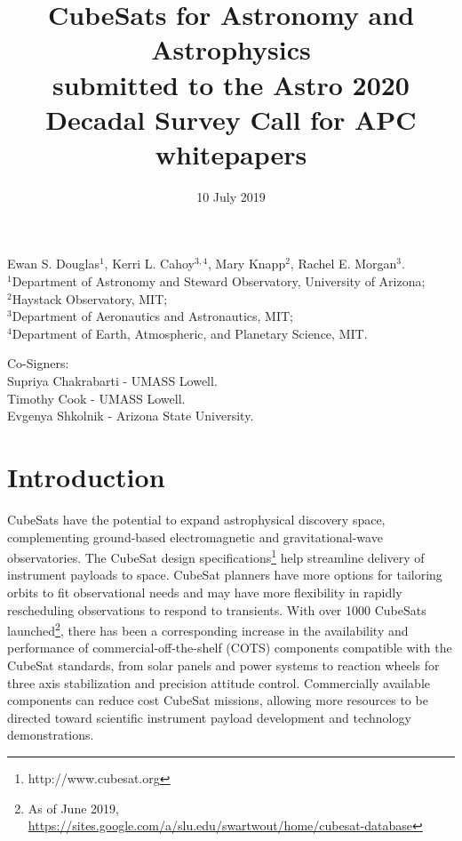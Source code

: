 \documentclass[12pt]{article}
\title{CubeSats for Astronomy and Astrophysics\\
\small{submitted to the Astro 2020 Decadal Survey Call for APC whitepapers}}
\date{10 July 2019}
\begin{document}
\maketitle
\begin{center}
    
Ewan S. Douglas$^1$,
Kerri L. Cahoy$^{3,4}$,
Mary Knapp$^2$,
Rachel E. Morgan$^3$.
\\
$^1$Department of Astronomy and Steward Observatory, University of Arizona;\\
$^2$Haystack Observatory, MIT;\\
$^3$Department of Aeronautics and Astronautics, MIT;\\
$^4$Department of Earth, Atmospheric, and Planetary Science, MIT.\\
\end{center}
Co-Signers:\\
Supriya Chakrabarti - UMASS Lowell. \\
Timothy Cook - UMASS Lowell.\\
Evgenya Shkolnik - Arizona State University.






\section{Introduction}
CubeSats have the potential to expand astrophysical discovery space, complementing ground-based electromagnetic and gravitational-wave observatories. The CubeSat design specifications\footnote{http://www.cubesat.org} help streamline delivery of instrument payloads to space. 
CubeSat planners have more options for tailoring orbits to fit observational needs and may have more flexibility in rapidly rescheduling observations to respond to transients. With over 1000 CubeSats launched\footnote{As of June 2019, \url{https://sites.google.com/a/slu.edu/swartwout/home/cubesat-database}}, there has been a corresponding increase in the availability and performance of commercial-off-the-shelf (COTS) components compatible with the CubeSat standards, from solar panels and power systems to reaction wheels for three axis stabilization and precision attitude control. Commercially available components can reduce cost CubeSat missions, allowing more resources to be directed toward scientific instrument payload development and technology demonstrations. 
\end{document}
